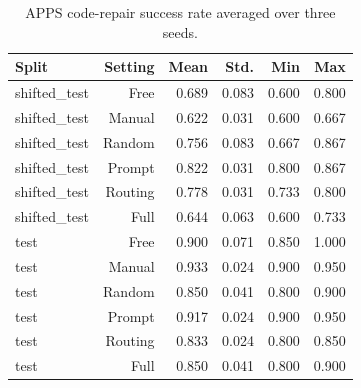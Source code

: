 \begin{table}[t]
\centering
\small
\begin{tabular}{lrrrrr}
\toprule
Split & Setting & Mean & Std. & Min & Max \\
\midrule
shifted\_test & Free & 0.689 & 0.083 & 0.600 & 0.800 \\
shifted\_test & Manual & 0.622 & 0.031 & 0.600 & 0.667 \\
shifted\_test & Random & 0.756 & 0.083 & 0.667 & 0.867 \\
shifted\_test & Prompt & 0.822 & 0.031 & 0.800 & 0.867 \\
shifted\_test & Routing & 0.778 & 0.031 & 0.733 & 0.800 \\
shifted\_test & Full & 0.644 & 0.063 & 0.600 & 0.733 \\
test & Free & 0.900 & 0.071 & 0.850 & 1.000 \\
test & Manual & 0.933 & 0.024 & 0.900 & 0.950 \\
test & Random & 0.850 & 0.041 & 0.800 & 0.900 \\
test & Prompt & 0.917 & 0.024 & 0.900 & 0.950 \\
test & Routing & 0.833 & 0.024 & 0.800 & 0.850 \\
test & Full & 0.850 & 0.041 & 0.800 & 0.900 \\
\bottomrule
\end{tabular}
\caption{APPS code-repair success rate averaged over three seeds.}
\label{tab:apps-main}
\end{table}
